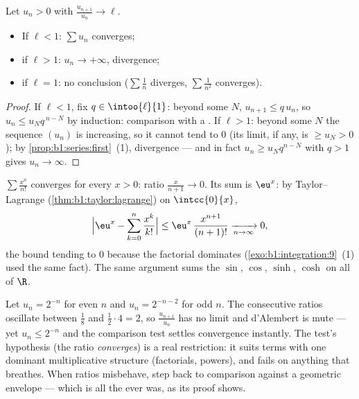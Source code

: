 \begin{theorem}\label{thm:b1:series:ratio}
Let $u_n > 0$ with $\frac{u_{n+1}}{u_n} \to \ell$.
\begin{itemize}
  \item If $\ell < 1$: $\sum u_n$ converges;
  \item if $\ell > 1$: $u_n \to +\infty$, divergence;
  \item if $\ell = 1$: no conclusion ($\sum \frac1n$ diverges, $\sum
        \frac{1}{n^2}$ converges).
\end{itemize}
\end{theorem}

\begin{proof}
If $\ell < 1$, fix $q \in \intoo{\ell}{1}$: beyond some $N$,
$u_{n+1} \leq q\,u_n$, so $u_n \leq u_N q^{\,n-N}$ by induction:
comparison with a . If $\ell > 1$: beyond some $N$
the sequence $(u_n)$ is increasing, so it cannot tend to $0$
(its limit, if any, is $\geq u_N > 0$); by
\cref{prop:b1:series:first}~(1), divergence --- and in fact $u_n
\geq u_N q^{n-N}$ with $q > 1$ gives $u_n \to \infty$.
\end{proof}

\begin{example}\label{ex:b1:series:ratio}
$\sum \frac{x^n}{n!}$ converges for every $x > 0$: ratio
$\frac{x}{n+1} \to 0$. Its sum is $\eu^x$: by Taylor--Lagrange
(\cref{thm:b1:taylor:lagrange}) on $\intcc{0}{x}$,
\[
\Bigl| \eu^x - \sum_{k=0}^{n} \frac{x^k}{k!} \Bigr|
\leq \eu^{x}\, \frac{x^{n+1}}{(n+1)!} \xrightarrow[n\to\infty]{} 0 ,
\]
the bound tending to $0$ because the factorial dominates
(\cref{exo:b1:integration:9}~(1) used the same fact). The same
argument sums the $\sin$, $\cos$, $\sinh$, $\cosh$  on all of
$\R$.
\end{example}

\begin{example}\label{ex:b1:series:rationotnecessary}
Let $u_n = 2^{-n}$ for even $n$ and $u_n = 2^{-n-2}$ for odd
$n$. The consecutive ratios oscillate between $\frac{1}{8}$ and
$\frac12\cdot4 = 2$, so $\frac{u_{n+1}}{u_n}$ has no limit and
d'Alembert is mute --- yet $u_n \leq 2^{-n}$ and the comparison
test settles convergence instantly. The test's hypothesis (the
ratio \emph{converges}) is a real restriction: it suits terms
with one dominant multiplicative structure (factorials, powers),
and fails on anything that breathes. When ratios misbehave,
step back to comparison against a geometric envelope --- which
is all the  ever was, as its proof shows.
\end{example}

